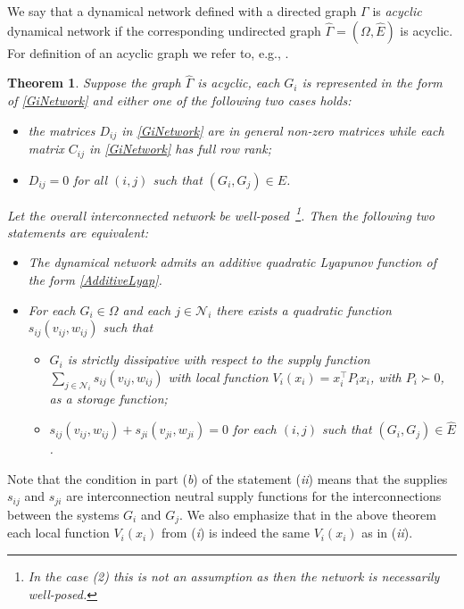 \documentclass[11pt,a4paper,oneside,DIV=12,headings=small]{scrartcl}
\newcommand{\cN}{\mathcal{N}}
\newtheorem{theorem}{Theorem}[section]
\theoremstyle{plain}
\begin{document}
We say that a dynamical network defined with a directed graph $\Gamma$ is \emph{acyclic} dynamical network if the corresponding undirected graph $\hat{\Gamma}=(\Omega,\hat{E})$ is acyclic. For definition of an acyclic graph we refer to, e.g., \cite{Bollobas}. 




\begin{theorem}
\label{TH1}
Suppose the graph $\hat{\Gamma}$ is acyclic, each $G_i$ is represented in the form of \eqref{GiNetwork} and either one of the following two cases holds:  
\begin{itemize}
\item[1)] the matrices $D_{ij}$ in \eqref{GiNetwork} are in general non-zero matrices while each matrix $C_{ij}$ in \eqref{GiNetwork} has full row rank; 
\item[2)] $D_{ij}=0$ for all $(i,j)$ such that $(G_i,G_j) \in E$.
\end{itemize}
Let the overall interconnected network be well-posed~\footnote{In the case (2) this is not an assumption as then the network is necessarily well-posed.}.  
Then the following two statements are equivalent:
\begin{itemize}
\item[i)] The dynamical network admits an additive quadratic Lyapunov function of the form \eqref{AdditiveLyap}.
\item[ii)] For each $G_i \in \Omega$ and each $j \in \cN_i$ there exists a quadratic function $s_{ij}(v_{ij},w_{ij})$ such that 
\begin{itemize}
\item[a)] $G_i$ is strictly dissipative with respect to the supply function $\sum_{j \in \cN_i} s_{ij}(v_{ij},w_{ij})$ with local function $V_i(x_i)=x_i^\top P_i x_i$, with $P_i \succ 0$, as a storage function; 
\item[b)] $s_{ij}(v_{ij},w_{ij})+s_{ji}(v_{ji},w_{ji})=0$ for each $(i,j)$ such that $(G_i,G_j) \in \hat{E}$.
\end{itemize}
\end{itemize}
\end{theorem}
Note that the condition in part (\emph{b}) of the statement (\emph{ii}) means that the supplies $s_{ij}$ and $s_{ji}$ are interconnection neutral supply functions for the interconnections between the systems $G_i$ and $G_j$. 
We also emphasize that in the above theorem each local function $V_i(x_i)$ from (\emph{i}) is indeed the same $V_i(x_i)$ as in (\emph{ii}). 
\end{document}
